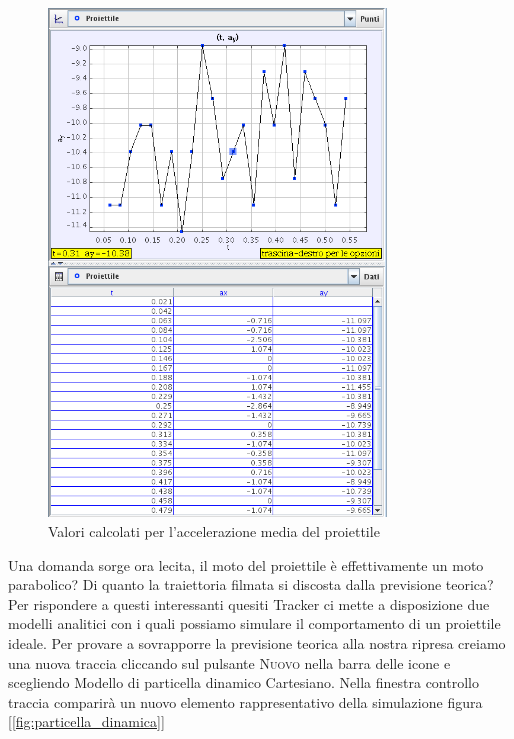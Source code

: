 \documentclass[a4paper,10pt,oneside]{article}
\begin{document}
\begin{figure}[H]
 \centering
 \includegraphics[width=0.8\textwidth]{./immagini/accelerazione2.png}
 \caption{Valori calcolati per l'accelerazione media del proiettile}
 \label{fig:tracker_accelerazione}
\end{figure}

Una domanda sorge ora lecita, il moto del proiettile è effettivamente un moto parabolico? Di quanto la traiettoria filmata si discosta dalla previsione teorica? Per rispondere a questi interessanti quesiti Tracker ci mette a disposizione due modelli analitici con i quali possiamo simulare il comportamento di un proiettile ideale. Per provare a sovrapporre la previsione teorica alla nostra ripresa creiamo una nuova traccia cliccando sul pulsante \textsc{Nuovo} nella barra delle icone e scegliendo \RIGHTarrow Modello di particella dinamico \RIGHTarrow Cartesiano. Nella finestra controllo traccia comparirà un nuovo elemento rappresentativo della simulazione figura [\ref{fig:particella_dinamica}]
\end{document}
